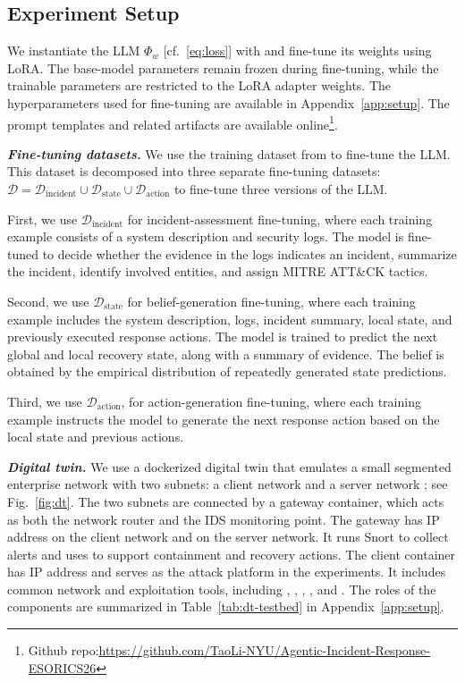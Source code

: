 \documentclass[runningheads,10pt]{llncs}
\begin{document}
\subsection{Experiment Setup}\label{sec:experiment_setup}

We instantiate the LLM $\Phi_w$ [cf.~\eqref{eq:loss}] with  and fine-tune its weights using LoRA. The base-model parameters remain frozen during fine-tuning, while the trainable parameters are restricted to the LoRA adapter weights. The hyperparameters used for fine-tuning are available in Appendix~\ref{app:setup}. The prompt templates and related artifacts are available online\footnote{Github repo:\url{https://github.com/TaoLi-NYU/Agentic-Incident-Response-ESORICS26}}.

\noindent\textit{\textbf{Fine-tuning datasets.}}
We use the training dataset from \cite{kim26ndss} to fine-tune the LLM. This dataset is decomposed into three separate fine-tuning datasets: $\mathcal{D}=\mathcal{D}_{\mathrm{incident}}\cup\mathcal{D}_{\mathrm{state}}\cup\mathcal{D}_{\mathrm{action}}$ to fine-tune three versions of the LLM.

First, we use $\mathcal{D}_{\mathrm{incident}}$ for incident-assessment fine-tuning, where each training example consists of a system description and security logs. The model is fine-tuned to decide whether the evidence in the logs indicates an incident, summarize the incident, identify involved entities, and assign MITRE ATT\&CK tactics. 

Second, we use $\mathcal{D}_{\mathrm{state}}$ for belief-generation fine-tuning, where each training example includes the system description, logs, incident summary, local state, and previously executed response actions. The model is trained to predict the next global and local recovery state, along with a summary of evidence. The belief is obtained by the empirical distribution of repeatedly generated state predictions. 

Third, we use $\mathcal{D}_{\mathrm{action}}$, for action-generation fine-tuning, where each training example instructs the model to generate the next response action based on the local state and previous actions. 

\noindent\textit{\textbf{Digital twin.}}
We use a dockerized digital twin that emulates a small segmented enterprise network with two subnets: a client network  and a server network ; see Fig.~\ref{fig:dt}. The two subnets are connected by a gateway container, which acts as both the network router and the IDS monitoring point. The gateway has IP address  on the client network and  on the server network. It runs Snort to collect alerts and uses  to support containment and recovery actions. The client container has IP address  and serves as the attack platform in the experiments. It includes common network and exploitation tools, including , , , , and . The roles of the components are summarized in Table~\ref{tab:dt-testbed} in Appendix~\ref{app:setup}.
\end{document}
